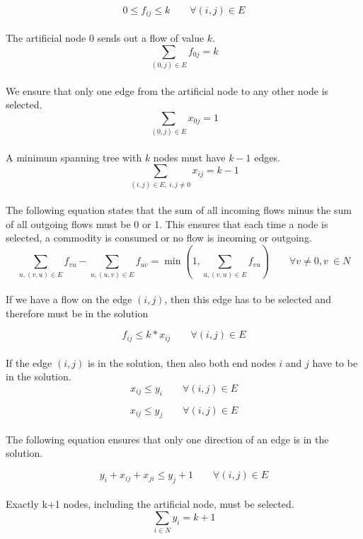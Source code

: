 \begin{equation}
  0 \leq f_{ij} \leq k \qquad \forall (i,j) \in E
\end{equation}
\\
The artificial node $0$ sends out a flow of value $k$.
\begin{equation}
  \sum_{(0,j) \in E} f_{0j} = k 
\end{equation}
\\
We ensure that only one edge from the artificial node to any
other node is selected.
\begin{equation}
  \sum_{(0,j) \in E} x_{0j} = 1 
\end{equation}
\\
A minimum spanning tree with $k$ nodes must have $k-1$ edges.
\begin{equation}
  \sum_{(i,j) \in E, \ i,j \not =  0} x_{ij} = k-1 
\end{equation}
\\
The following equation states that the sum of all incoming flows minus the sum of all outgoing flows must be 0 or 1. This ensures that each time a node is selected, a commodity is consumed or no flow is incoming or outgoing.
\begin{equation}
  \sum_{u, (v,u) \in E} f_{vu} - \sum_{u, (u,v) \in E} f_{uv} = \min (1, \sum_{u, (v,u) \in E} f_{vu}) \qquad  \forall v \not = 0, v \ \in N 
\end{equation}
\\
If we have a flow on the edge $(i,j)$, then this edge has to be selected and therefore must be in the solution

\begin{equation}
  f_{ij} \leq k * x_{ij} \qquad \forall (i,j) \in E 
\end{equation}
\\
If the edge $(i,j)$ is in the solution, then also both end nodes $i$ and $j$ 
have to be in the solution.
\begin{equation}
  x_{ij} \leq y_{i} \qquad \forall (i,j) \in E
  \label{lbl:xy1}
\end{equation}

\begin{equation}
  x_{ij} \leq y_{j} \qquad \forall (i,j) \in E
  \label{lbl:xy2}
\end{equation}
\\
The following equation ensures that only one direction of an edge is in the solution.

\begin{equation}
 y_{i} + x_{ij} + x_{ji} \leq y_{j} + 1 \qquad \forall (i,j) \in E
 \label{lbl:xy3}
\end{equation}
\\
Exactly k+1 nodes, including the artificial node, must be selected.
\begin{equation}
  \sum_{i \in N} y_i = k + 1
  \label{lbl:yk}
\end{equation}



